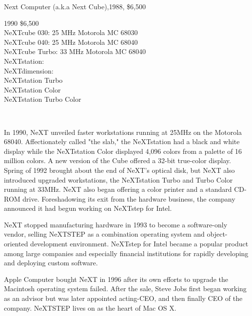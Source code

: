 Next Computer (a.k.a Next Cube),1988, \$6,500\\
\par
1990 \$6,500\\
NeXTcube 030: 25 MHz Motorola MC 68030\\
NeXTcube 040: 25 MHz Motorola MC 68040\\
NeXTcube Turbo: 33 MHz Motorola MC 68040\\
NeXTstation:\\
NeXTdimension:\\
NeXTstation Turbo\\
NeXTstation Color\\
NeXTstation Turbo Color\\
\par
{}
\par
{}\\
\begin{minipage}{\textwidth}
 
\end{minipage}
\par
In 1990, NeXT unveiled faster workstations running at 25MHz on the Motorola 68040. Affectionately called "the slab," the NeXTstation had a black and white display while the NeXTstation Color displayed 4,096 colors from a palette of 16 million colors. A new version of the Cube offered a 32-bit true-color display.
Spring of 1992 brought about the end of NeXT's optical disk, but NeXT also introduced upgraded workstations, the NeXTstation Turbo and Turbo Color running at 33MHz. NeXT also began offering a color printer and a standard CD-ROM drive. Foreshadowing its exit from the hardware business, the company announced it had begun working on NeXTstep for Intel.\\
\par
{}
\par
NeXT stopped manufacturing hardware in 1993 to become a software-only vendor, selling NeXTSTEP as a combination operating system and object-oriented development environment. NeXTstep for Intel became a popular product among large companies and especially financial institutions for rapidly developing and deploying custom software. \\
\par
Apple Computer bought NeXT in 1996 after its own efforts to upgrade the Macintosh operating system failed.  After the sale, Steve Jobs first began working as an advisor but was later appointed acting-CEO, and then finally CEO of the company.  NeXTSTEP lives on as the heart of Mac OS X.\\
\par
{}
\par
{}

